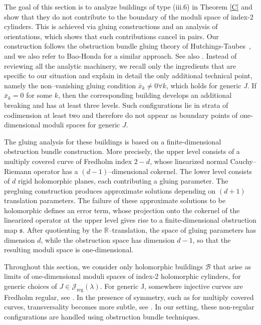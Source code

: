 \documentclass{amsart}
\begin{document}
The goal of this section is to analyze buildings of type (iii.6) in Theorem \ref{C} and show that they do not contribute to the boundary of the moduli space of index-2 cylinders. This is achieved via gluing constructions and an analysis of orientations, which shows that such contributions cancel in pairs.
Our construction follows the obstruction bundle gluing theory of
Hutchings-Taubes~\cite{hutchings2009}, and we also refer to Bao-Honda \cite{BH18} for a similar approach. See also \cite{datta2025invitation}. Instead of reviewing all the analytic
machinery, we recall only the ingredients that are specific to our situation and explain in detail the only additional technical point, namely the non–vanishing gluing condition $\bar x_k \neq 0 \forall k$,
which holds for generic $J$.  
If $\bar{x}_k = 0$ for some $k$, then the corresponding building develops an additional breaking and has at least three levels. Such configurations lie in strata of codimension at least two and therefore do not appear as boundary points of one-dimensional moduli spaces for generic $J$.

The gluing analysis for these buildings is based on a finite-dimensional obstruction bundle construction. More precisely, the upper level consists of a multiply covered curve of Fredholm index $2-d$, whose linearized normal Cauchy–Riemann operator has a $(d-1)$–dimensional cokernel. The lower level consists of $d$ rigid holomorphic planes, each contributing a gluing parameter.
The pregluing construction produces approximate solutions depending on $(d+1)$ translation parameters. The failure of these approximate solutions to be holomorphic defines an error term, whose projection onto the cokernel of the linearized operator at the upper level gives rise to a finite-dimensional obstruction map $\mathfrak s$. After quotienting by the $\mathbb{R}$–translation, the space of gluing parameters has dimension $d$, while the obstruction space has dimension $d-1$, so that the resulting moduli space is one-dimensional. 

Throughout this section, we consider only holomorphic buildings $\mathcal B$ that arise as limits of 
one-dimensional moduli spaces of index-2 holomorphic cylinders, for generic choices of 
$J \in \mathcal{J}_{\mathrm{reg}}(\lambda)$. For generic J, somewhere injective curves are Fredholm regular, see 
\cite{W10}. In the presence of symmetry, such as for multiply covered 
curves, transversality becomes more subtle, see \cite{Zhou_polyfold}. In our setting, 
these non-regular configurations are handled using obstruction bundle 
techniques.
\end{document}
